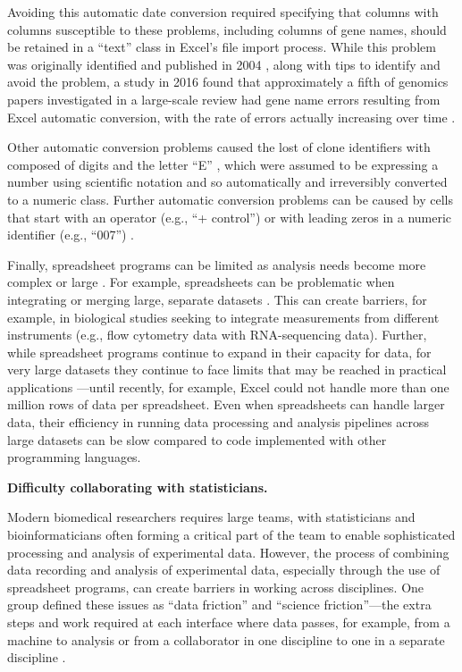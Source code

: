 \documentclass[]{tufte-book}
\begin{document}
Avoiding this automatic date conversion required specifying that columns with
columns susceptible to these problems, including columns of gene names, should
be retained in a ``text'' class in Excel's file import process. While this
problem was originally identified and published in 2004 \citep{zeeberg2004mistaken},
along with tips to identify and avoid the problem, a study in 2016 found that
approximately a fifth of genomics papers investigated in a large-scale review
had gene name errors resulting from Excel automatic conversion, with the rate of
errors actually increasing over time \citep{ziemann2016gene}.

Other automatic conversion problems caused the lost of clone identifiers with
composed of digits and the letter ``E'' \citep{zeeberg2004mistaken, welsh2017escape},
which were assumed to be expressing a number using scientific notation and so
automatically and irreversibly converted to a numeric class. Further automatic
conversion problems can be caused by cells that start with an operator (e.g., ``+
control'') or with leading zeros in a numeric identifier (e.g., ``007'')
\citep{welsh2017escape}.

Finally, spreadsheet programs can be limited as analysis needs become more
complex or large \citep{topaloglou2004biological}. For example, spreadsheets can be
problematic when integrating or merging large, separate datasets
\citep{birch2018future}. This can create barriers, for example, in biological studies
seeking to integrate measurements from different instruments (e.g., flow
cytometry data with RNA-sequencing data). Further, while spreadsheet programs
continue to expand in their capacity for data, for very large datasets they
continue to face limits that may be reached in practical applications
\citep{birch2018future}---until recently, for example, Excel could not handle more
than one million rows of data per spreadsheet. Even when spreadsheets can handle
larger data, their efficiency in running data processing and analysis pipelines
across large datasets can be slow compared to code implemented with other
programming languages.

\textbf{Difficulty collaborating with statisticians.}

Modern biomedical researchers requires large teams, with statisticians and
bioinformaticians often forming a critical part of the team to enable
sophisticated processing and analysis of experimental data. However, the process
of combining data recording and analysis of experimental data, especially
through the use of spreadsheet programs, can create barriers in working across
disciplines. One group defined these issues as ``data friction'' and ``science
friction''---the extra steps and work required at each interface where data
passes, for example, from a machine to analysis or from a collaborator in one
discipline to one in a separate discipline \citep{edwards2011science}.
\end{document}
